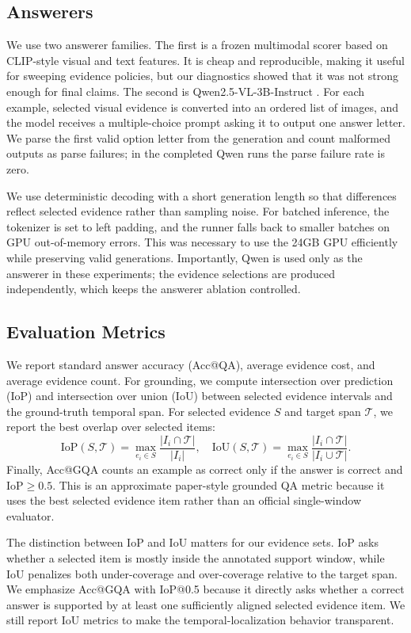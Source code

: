 \documentclass{article}
\begin{document}
\subsection{Answerers}
We use two answerer families. The first is a frozen multimodal scorer based on CLIP-style visual and text features. It is cheap and reproducible, making it useful for sweeping evidence policies, but our diagnostics showed that it was not strong enough for final claims. The second is Qwen2.5-VL-3B-Instruct \citep{qwen2025vl}. For each example, selected visual evidence is converted into an ordered list of images, and the model receives a multiple-choice prompt asking it to output one answer letter. We parse the first valid option letter from the generation and count malformed outputs as parse failures; in the completed Qwen runs the parse failure rate is zero.

We use deterministic decoding with a short generation length so that differences reflect selected evidence rather than sampling noise. For batched inference, the tokenizer is set to left padding, and the runner falls back to smaller batches on GPU out-of-memory errors. This was necessary to use the 24GB GPU efficiently while preserving valid generations. Importantly, Qwen is used only as the answerer in these experiments; the evidence selections are produced independently, which keeps the answerer ablation controlled.

\subsection{Evaluation Metrics}
We report standard answer accuracy (Acc@QA), average evidence cost, and average evidence count. For grounding, we compute intersection over prediction (IoP) and intersection over union (IoU) between selected evidence intervals and the ground-truth temporal span. For selected evidence $S$ and target span $\mathcal{T}$, we report the best overlap over selected items:
\[
  \mathrm{IoP}(S,\mathcal{T}) = \max_{e_i \in S}
  \frac{|I_i \cap \mathcal{T}|}{|I_i|},
  \quad
  \mathrm{IoU}(S,\mathcal{T}) = \max_{e_i \in S}
  \frac{|I_i \cap \mathcal{T}|}{|I_i \cup \mathcal{T}|}.
\]
Finally, Acc@GQA counts an example as correct only if the answer is correct and $\mathrm{IoP}\geq 0.5$. This is an approximate paper-style grounded QA metric because it uses the best selected evidence item rather than an official single-window evaluator.

The distinction between IoP and IoU matters for our evidence sets. IoP asks whether a selected item is mostly inside the annotated support window, while IoU penalizes both under-coverage and over-coverage relative to the target span. We emphasize Acc@GQA with IoP@0.5 because it directly asks whether a correct answer is supported by at least one sufficiently aligned selected evidence item. We still report IoU metrics to make the temporal-localization behavior transparent.
\end{document}
